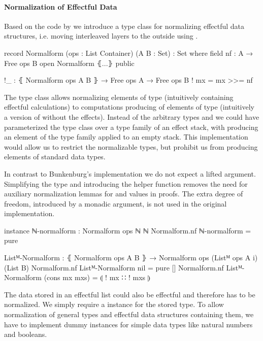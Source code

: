 \paragraph{Normalization of Effectful Data}

Based on the code by \textcite{bunkenburg2019modeling} we introduce a type
class for normalizing effectful data structures, i.e. moving interleaved
 layers to the outside using \AgdaFunction{>>=}.

\begin{code}
record Normalform (ops : List Container) (A B : Set) : Set where
  field nf : A → Free ops B
open Normalform ⦃...⦄ public

!_ : ⦃ Normalform ops A B ⦄ → Free ops A → Free ops B
! mx = mx >>= nf
\end{code}
The type class allows normalizing elements of type  (intuitively
containing effectful calculations) to computations producing of elements of type
 (intuitively a version of  without the effects).
Instead of the arbitrary types  and  we could
have parameterized the type class over a type family of an effect stack, with
producing an element of the type family applied to an empty stack.
This implementation would allow us to restrict the normalizable types, but
prohibit us from producing elements of standard data types.

In contrast to Bunkenburg's implementation we do not expect a lifted argument.
Simplifying the type and introducing the helper function \AgdaFunction{!\_}
removes the need for auxiliary normalization lemmas for
 and  values in
proofs.
The extra degree of freedom, introduced by a monadic argument, is not used in
the original implementation.

\begin{code}
instance
  ℕ-normalform : Normalform ops ℕ ℕ
  Normalform.nf ℕ-normalform = pure

  Listᴹ-Normalform : ⦃ Normalform ops A B ⦄ →
    Normalform ops (Listᴹ ops A {i}) (List B)
  Normalform.nf Listᴹ-Normalform nil            = pure []
  Normalform.nf Listᴹ-Normalform (cons mx mxs)  = ⦇ ! mx ∷ ! mxs ⦈
\end{code}
The data stored in an effectful list could also be effectful and therefore has
to be normalized.
We simply require a  instance for the stored type.
To allow normalization of general types and effectful data structures containing
them, we have to implement dummy instances for simple data types like natural
numbers and booleans.

